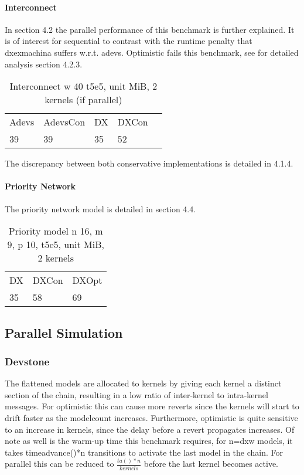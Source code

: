 \paragraph*{Interconnect}
In section 4.2 the parallel performance of this benchmark is further explained. It is of interest for sequential to contrast with the runtime penalty that dxexmachina suffers w.r.t. adevs. Optimistic fails this benchmark, see for detailed analysis section 4.2.3.
\begin{table}[lhtb]
	\centering
	\caption{Interconnect w 40 t5e5, unit MiB, 2 kernels (if parallel)}
	\label{iconn_mem}
	\begin{tabular}{lllll}
		Adevs & AdevsCon &DX &DXCon\\
		39 & 39 & 35 & 52  \\
	\end{tabular}
\end{table}
The discrepancy between both conservative implementations is detailed in 4.1.4.
		
\paragraph*{Priority Network}
The priority network model is detailed in section 4.4.
\begin{table}[lhtb]
	\centering
	\caption{Priority model n 16, m 9, p 10,  t5e5, unit MiB, 2 kernels}
	\label{pmod_mem}
	\begin{tabular}{lll}
		DX &DXCon &DXOpt\\
		35 & 58 &69\\
	\end{tabular}
\end{table}

\subsection{Parallel Simulation}
\subsubsection{Devstone}
The flattened models are allocated to kernels by giving each kernel a distinct section of the chain, resulting in a low ratio of inter-kernel to intra-kernel messages. For optimistic this can cause more reverts since the kernels will start to drift faster as the modelcount increases. Furthermore, optimistic is quite sensitive to an increase in kernels, since the delay before a revert propagates increases. Of note as well is the warm-up time this benchmark requires, for n=dxw models, it takes timeadvance()*n transitions to activate the last model in the chain. For parallel this can be reduced to $\frac{ta()*n}{kernels}$ before the last kernel becomes active.

